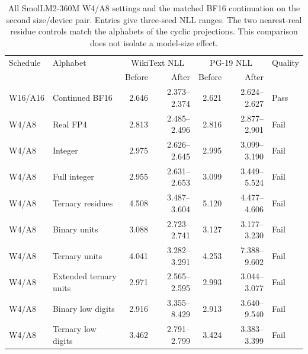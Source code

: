 \documentclass[11pt]{article}
\begin{document}
\begin{table}[p]
\centering\scriptsize
\setlength{\tabcolsep}{3.5pt}
\caption{All SmolLM2-360M W4/A8 settings and the matched BF16 continuation on the second size/device pair. Entries give three-seed NLL ranges. The two nearest-real residue controls match the alphabets of the cyclic projections. This comparison does not isolate a model-size effect.}
\label{tab:low-precision-confirmation}
\begin{tabular}{llrrrrl}
\toprule
Schedule & Alphabet & \multicolumn{2}{c}{WikiText NLL} & \multicolumn{2}{c}{PG-19 NLL} & Quality\\
& & Before & After & Before & After & \\
\midrule
W16/A16 & Continued BF16 & 2.646 & 2.373--2.374 & 2.621 & 2.624--2.627 & Pass \\
W4/A8 & Real FP4 & 2.813 & 2.485--2.496 & 2.816 & 2.877--2.901 & Fail \\
W4/A8 & Integer & 2.975 & 2.626--2.645 & 2.995 & 3.099--3.190 & Fail \\
W4/A8 & Full integer & 2.955 & 2.631--2.653 & 3.099 & 3.449--5.524 & Fail \\
W4/A8 & Ternary residues & 4.508 & 3.487--3.604 & 5.120 & 4.477--4.606 & Fail \\
W4/A8 & Binary units & 3.088 & 2.723--2.741 & 3.127 & 3.177--3.230 & Fail \\
W4/A8 & Ternary units & 4.041 & 3.282--3.291 & 4.253 & 7.388--9.602 & Fail \\
W4/A8 & Extended ternary units & 2.971 & 2.565--2.595 & 2.993 & 3.044--3.077 & Fail \\
W4/A8 & Binary low digits & 2.916 & 3.355--8.429 & 2.913 & 3.640--9.540 & Fail \\
W4/A8 & Ternary low digits & 3.462 & 2.791--2.799 & 3.424 & 3.383--3.399 & Fail \\
\bottomrule
\end{tabular}
\end{table}
\end{document}
